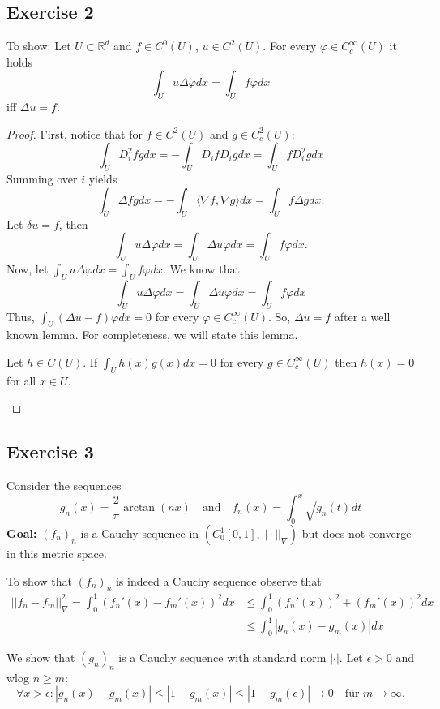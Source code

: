 \documentclass[a4paper]{article}
\begin{document}
\subsection*{Exercise 2}
To show: Let $U \subset \mathbb R^d$ and $f \in C^0(U)$, $u \in C^2(U)$. For every $\varphi \in C^\infty_c(U)$ it holds
\[
	\int_U u\Delta\varphi dx = \int_U f \varphi  dx
\]
iff $\Delta u = f$.
\begin{proof}
First, notice that for $f \in C^2(U)$ and $g \in C^2_c(U)$:
\[
	\int_U D_i^2fg dx = - \int_U D_ifD_ig dx = \int_U f D_i^2g dx
\]
Summing over $i$ yields
\[
	\int_U \Delta fg dx = - \int_U \langle \nabla f, \nabla g \rangle dx = \int_U f \Delta g dx.
\]
Let $\delta u = f$, then
\[
	\int_U u \Delta \varphi dx = \int_U \Delta u \varphi dx = \int_U f\varphi dx.
\]
Now, let $\int_U u \Delta \varphi dx = \int_U f\varphi dx$. We know that
\[
	\int_U u \Delta \varphi dx = \int_U \Delta u \varphi dx = \int_U f\varphi dx
\]
Thus, $\int_U (\Delta u - f) \varphi dx = 0$ for every $\varphi \in C^\infty_c(U)$. So, $\Delta u = f$ after a well known lemma. For completeness, we will state this lemma.

\begin{lemma}{}{}
Let $h \in C(U)$. If $\int_U h(x)g(x) dx = 0$ for every $g \in C^\infty_c(U)$ then $h(x) = 0$ for all $x \in U$.
\end{lemma}
\end{proof}

\subsection*{Exercise 3}

Consider the sequences
\[
	g_n(x) = \frac{2}{\pi} \arctan(nx)  \quad \text{and} \quad f_n(x) = \int^x_0 \sqrt{g_n(t)} dt
\]
\textbf{Goal:} $(f_n)_n$ is a Cauchy sequence in $(C^1_0[0,1], ||\cdot||_\nabla)$ but does not converge in this metric space.

To show that $(f_n)_n$ is indeed a Cauchy sequence observe that
\begin{align*}
	||f_n - f_m||^2_\nabla = \int^1_0 (f_n'(x) - f_m'(x))^2 dx &\leq  \int^1_0 (f_n'(x))^2 + (f_m'(x))^2 dx \\
	 &\leq \int^1_0 |g_n(x) - g_m(x)|dx
\end{align*}

We show that $(g_n)_n$ is a Cauchy sequence with standard norm $|\cdot|$. Let $\epsilon > 0$ and wlog $n \geq m$:
\[
	\forall x > \epsilon: | g_n(x) - g_m(x) | \leq | 1 - g_m(x) | \leq |1 - g_m(\epsilon)| \to 0 \quad \text{für $m \to \infty$}.
\]
\end{document}
